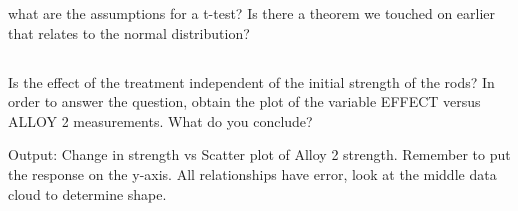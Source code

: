 \documentclass[letterpaper]{article}
\begin{document}
what are the assumptions for a t-test? Is there a theorem we touched on earlier
that relates to the normal distribution?

\subsection{}%
Is the effect of the treatment independent of the initial strength of the rods?
In order to answer the  question, obtain the plot of the variable EFFECT versus
ALLOY 2 measurements. What do you  conclude?

Output: Change in strength vs Scatter plot of Alloy 2 strength.
Remember to put the response on the y-axis. All relationships have
error, look at the middle data cloud to determine shape.

\end{document}
